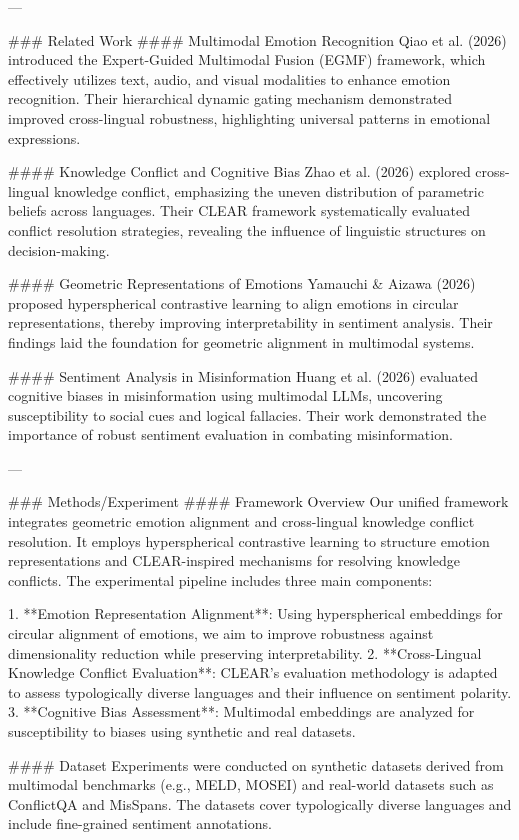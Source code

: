 ---

### Related Work
#### Multimodal Emotion Recognition
Qiao et al. (2026) introduced the Expert-Guided Multimodal Fusion (EGMF) framework, which effectively utilizes text, audio, and visual modalities to enhance emotion recognition. Their hierarchical dynamic gating mechanism demonstrated improved cross-lingual robustness, highlighting universal patterns in emotional expressions.

#### Knowledge Conflict and Cognitive Bias
Zhao et al. (2026) explored cross-lingual knowledge conflict, emphasizing the uneven distribution of parametric beliefs across languages. Their CLEAR framework systematically evaluated conflict resolution strategies, revealing the influence of linguistic structures on decision-making.

#### Geometric Representations of Emotions
Yamauchi & Aizawa (2026) proposed hyperspherical contrastive learning to align emotions in circular representations, thereby improving interpretability in sentiment analysis. Their findings laid the foundation for geometric alignment in multimodal systems.

#### Sentiment Analysis in Misinformation
Huang et al. (2026) evaluated cognitive biases in misinformation using multimodal LLMs, uncovering susceptibility to social cues and logical fallacies. Their work demonstrated the importance of robust sentiment evaluation in combating misinformation.

---

### Methods/Experiment
#### Framework Overview
Our unified framework integrates geometric emotion alignment and cross-lingual knowledge conflict resolution. It employs hyperspherical contrastive learning to structure emotion representations and CLEAR-inspired mechanisms for resolving knowledge conflicts. The experimental pipeline includes three main components:

1. **Emotion Representation Alignment**: Using hyperspherical embeddings for circular alignment of emotions, we aim to improve robustness against dimensionality reduction while preserving interpretability.
2. **Cross-Lingual Knowledge Conflict Evaluation**: CLEAR's evaluation methodology is adapted to assess typologically diverse languages and their influence on sentiment polarity.
3. **Cognitive Bias Assessment**: Multimodal embeddings are analyzed for susceptibility to biases using synthetic and real datasets.

#### Dataset
Experiments were conducted on synthetic datasets derived from multimodal benchmarks (e.g., MELD, MOSEI) and real-world datasets such as ConflictQA and MisSpans. The datasets cover typologically diverse languages and include fine-grained sentiment annotations.

